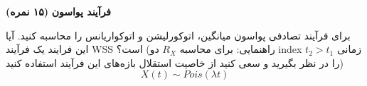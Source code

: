 \Large \textbf{فرآیند پواسون}
\large \textbf{(۱۵ نمره)}

\normalsize \vspace{0.5cm}
برای فرآیند تصادفی پواسون میانگین، اتوکورلیشن و اتوکواریانس را محاسبه کنید. آیا این فرایند یک فرآیند WSS است؟
(راهنمایی: برای محاسبه $ R_X $ دو index زمانی
$ t_2>t_1 $
 را در نظر بگیرید و سعی کنید از خاصیت استقلال بازه‌های این فرآیند استفاده کنید)
$$
 X(t) \sim Pois(\lambda t) 
$$

